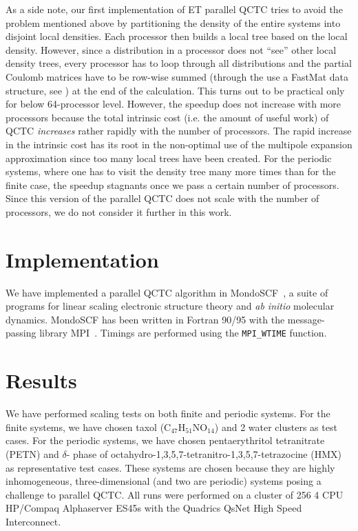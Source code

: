 \commentoutA{\documentclass[prl,aps,twocolumn,twocolumngrid,superbib]{revtex4}}
\begin{document}
As a side note, our first implementation of ET parallel QCTC tries to
avoid the problem mentioned above by partitioning the density of the
entire systems into disjoint local densities. Each processor then
builds a local tree based on the local density. However, since a
distribution in a processor does not ``see'' other local density
trees, every processor has to loop through all distributions and the
partial Coulomb matrices have to be row-wise summed (through the use a
FastMat data structure, see \cite{CGan03}) at the end of the
calculation. This turns out to be practical only for below
64-processor level. However, the speedup does not increase with more
processors because the total intrinsic cost (i.e. the amount of useful
work) of QCTC {\it increases} rather rapidly with the number of
processors. The rapid increase in the intrinsic cost has its root in
the non-optimal use of the multipole expansion approximation since too
many local trees have been created. For the periodic systems, where
one has to visit the density tree many more times than for the finite
case, the speedup stagnants once we pass a certain number of
processors. Since this version of the parallel QCTC does not scale
with the number of processors, we do not consider it further in this
work.

\section{Implementation}
\label{sec:implementation}
We have implemented a parallel QCTC algorithm in {\sc
MondoSCF}~\cite{MondoSCF}, a suite of programs for linear scaling
electronic structure theory and {\it ab initio}\/ molecular dynamics.
{\sc MondoSCF} has been written in Fortran 90/95 with the
message-passing library MPI~\cite{mpi}.  Timings are performed using
the {\tt MPI\_WTIME} function.

\section{Results}
\label{results}
We have performed scaling tests on both finite and periodic
systems. For the finite systems, we have chosen taxol
(C$_{47}$H$_{51}$NO$_{14}$) and 2 water clusters as test cases. For
the periodic systems, we have chosen pentaerythritol tetranitrate
(PETN)\cite{CGan04A} and $\delta$- phase of
octahydro-1,3,5,7-tetranitro-1,3,5,7-tetrazocine (HMX)\cite{JPLewis00}
as representative test cases. These systems are chosen because they
are highly inhomogeneous, three-dimensional (and two are periodic)
systems posing a challenge to parallel QCTC. All runs were performed
on a cluster of 256 4 CPU HP/Compaq Alphaserver ES45s with the
Quadrics QsNet High Speed Interconnect.
\end{document}

